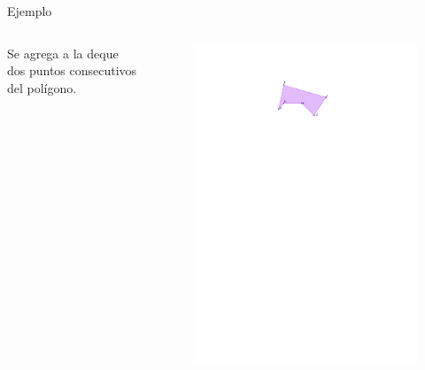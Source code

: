 \documentclass[aspectratio=169,xcolor=dvipsnames, t]{beamer}
\begin{document}
\begin{frame}{Ejemplo}
  \begin{columns}
    \begin{column}{0.5\textwidth}
      Se agrega a la deque dos puntos consecutivos del polígono.
    \end{column}
    \begin{column}{0.5\textwidth}
      \begin{figure}
        \centering
        \includegraphics[width=\linewidth, height=0.5\textheight, page=3, keepaspectratio]{IPE/Melkman.pdf}
      \end{figure}
    \end{column}
  \end{columns}
  
\end{frame}
\end{document}
